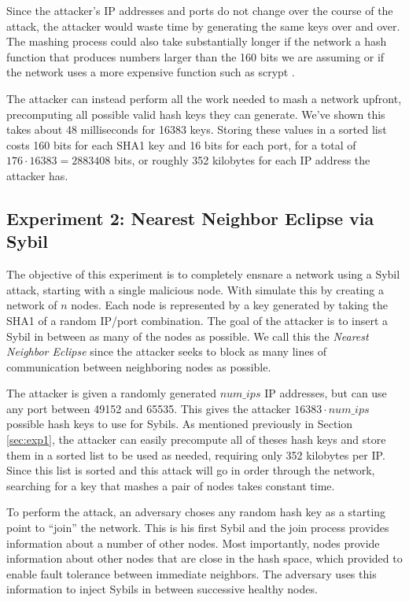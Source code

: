 \documentclass[11pt,conference]{IEEEtran}
\begin{document}
Since the attacker's IP addresses and ports do not change over the course of the attack, the attacker would waste time by generating the same keys over and over. 
The mashing process could also take substantially longer if the network a hash function that produces numbers larger than the 160 bits we are assuming or if the network uses a more expensive function such as scrypt \cite{scrypt}.

The attacker can instead perform all the work needed to mash a network upfront, precomputing all possible valid hash keys they can generate.
We've shown this takes about 48 milliseconds for 16383 keys.
Storing these values in a sorted list costs 160 bits for each SHA1 key and 16 bits for each port, for a total of $176  \cdot 16383 = 2883408$ bits, or roughly 352 kilobytes for each IP address the attacker has.




\subsection{Experiment 2:  Nearest Neighbor Eclipse via Sybil} %
The objective of this experiment is to completely ensnare a network using a Sybil attack, starting with a single malicious node.
With simulate this by creating a network of $n$ nodes.  
Each node is represented by a key generated by taking the SHA1 of a random IP/port combination.
The goal of the attacker is to insert a Sybil in between as many of the nodes as possible.
We call this the \textit{Nearest Neighbor Eclipse} since the attacker seeks to block as many lines of communication between neighboring nodes as possible.

The attacker is given a randomly generated $num\_ips$ IP addresses, but can use any port between 49152 and 65535.
This gives the attacker $ 16383 \cdot num\_ips $ possible hash keys to use for Sybils.
As mentioned previously in Section \ref{sec:exp1}, the attacker can easily precompute all of theses hash keys and store them in a sorted list to be used as needed, requiring only 352 kilobytes per IP.
Since this list is sorted and this attack will go in order through the network, searching for a key that mashes a pair of nodes takes constant time.

To perform the attack, an adversary choses any random hash key as a starting point to ``join'' the network.
This is his first Sybil and the join process provides information about a number of other nodes.
Most importantly,  nodes provide information about other nodes that are close in the hash space, which provided to enable fault tolerance between immediate neighbors.
The adversary uses this information to inject Sybils in between successive healthy nodes.
\end{document}
